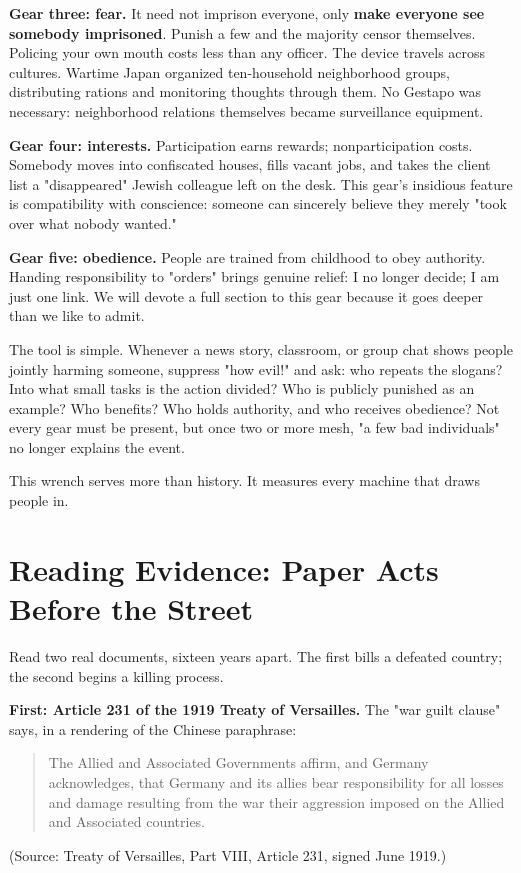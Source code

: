 \textbf{Gear three: fear.} It need not imprison everyone, only \textbf{make everyone see somebody imprisoned}. Punish a few and the majority censor themselves. Policing your own mouth costs less than any officer. The device travels across cultures. Wartime Japan organized ten-household neighborhood groups, distributing rations and monitoring thoughts through them. No Gestapo was necessary: neighborhood relations themselves became surveillance equipment.

\textbf{Gear four: interests.} Participation earns rewards; nonparticipation costs. Somebody moves into confiscated houses, fills vacant jobs, and takes the client list a "disappeared" Jewish colleague left on the desk. This gear's insidious feature is compatibility with conscience: someone can sincerely believe they merely "took over what nobody wanted."

\textbf{Gear five: obedience.} People are trained from childhood to obey authority. Handing responsibility to "orders" brings genuine relief: I no longer decide; I am just one link. We will devote a full section to this gear because it goes deeper than we like to admit.

The tool is simple. Whenever a news story, classroom, or group chat shows people jointly harming someone, suppress "how evil!" and ask: who repeats the slogans? Into what small tasks is the action divided? Who is publicly punished as an example? Who benefits? Who holds authority, and who receives obedience? Not every gear must be present, but once two or more mesh, "a few bad individuals" no longer explains the event.

This wrench serves more than history. It measures every machine that draws people in.

\section[Paper Acts Before the Street]{Reading Evidence: Paper Acts Before the Street}
Read two real documents, sixteen years apart. The first bills a defeated country; the second begins a killing process.

\textbf{First: Article 231 of the 1919 Treaty of Versailles.} The "war guilt clause" says, in a rendering of the Chinese paraphrase:

\begin{quote}
The Allied and Associated Governments affirm, and Germany acknowledges, that Germany and its allies bear responsibility for all losses and damage resulting from the war their aggression imposed on the Allied and Associated countries.
\end{quote}
(Source: Treaty of Versailles, Part VIII, Article 231, signed June 1919.)

